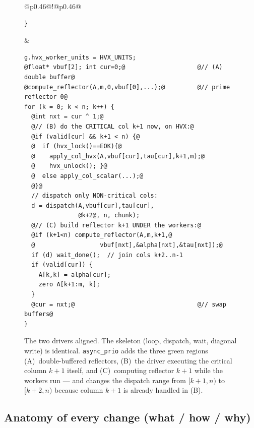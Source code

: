 \documentclass[11pt]{article}
\newcommand{\code}[1]{\texttt{\small #1}}
\begin{document}
\begin{landscape}
\begin{figure}[p]
\begin{tabular}{@{}p{0.46\linewidth}@{\hspace{6pt}}!{\color{gray!50}\vrule}@{\hspace{6pt}}p{0.46\linewidth}@{}}
\begin{minipage}[t]{\linewidth}
\begin{lstlisting}[style=cmini]
}
\end{lstlisting}
\end{minipage}
&
\begin{minipage}[t]{\linewidth}
\begin{lstlisting}[style=cmini,
   moredelim={[is][\color{hvxgreen}\bfseries]{@}{@}}]
g.hvx_worker_units = HVX_UNITS;
@float* vbuf[2]; int cur=0;@                    @// (A) double buffer@
@compute_reflector(A,m,0,vbuf[0],...);@         @// prime reflector 0@
for (k = 0; k < n; k++) {
  @int nxt = cur ^ 1;@
  @// (B) do the CRITICAL col k+1 now, on HVX:@
  @if (valid[cur] && k+1 < n) {@
  @  if (hvx_lock()==EOK){@
  @    apply_col_hvx(A,vbuf[cur],tau[cur],k+1,m);@
  @    hvx_unlock(); }@
  @  else apply_col_scalar(...);@
  @}@
  // dispatch only NON-critical cols:
  d = dispatch(A,vbuf[cur],tau[cur],
               @k+2@, n, chunk);
  @// (C) build reflector k+1 UNDER the workers:@
  @if (k+1<n) compute_reflector(A,m,k+1,@
  @                  vbuf[nxt],&alpha[nxt],&tau[nxt]);@
  if (d) wait_done();  // join cols k+2..n-1
  if (valid[cur]) {
    A[k,k] = alpha[cur];
    zero A[k+1:m, k];
  }
  @cur = nxt;@                                  @// swap buffers@
}
\end{lstlisting}
\end{minipage}
\end{tabular}
\caption{The two drivers aligned. The skeleton (loop, dispatch, wait, diagonal write)
is identical. \code{async\_prio} adds the three green regions (A)~double-buffered
reflectors, (B)~the driver executing the critical column $k{+}1$ itself, and
(C)~computing reflector $k{+}1$ while the workers run --- and changes the dispatch
range from $[k{+}1,n)$ to $[k{+}2,n)$ because column $k{+}1$ is already handled in (B).}
\label{fig:sidebyside}
\end{figure}
\end{landscape}

\subsection{Anatomy of every change (what / how / why)}
\end{document}
